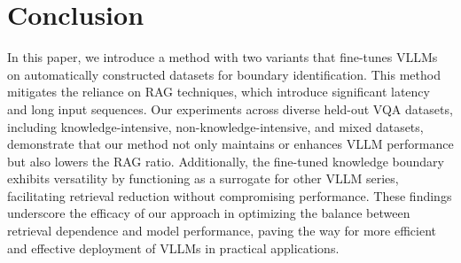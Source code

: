 \section{Conclusion}

In this paper, we introduce a method with two variants that fine-tunes VLLMs on automatically constructed datasets for boundary identification. This method mitigates the reliance on RAG techniques, which introduce significant latency and long input sequences. Our experiments across diverse held-out VQA datasets, including knowledge-intensive, non-knowledge-intensive, and mixed datasets, demonstrate that our method not only maintains or enhances VLLM performance but also lowers the RAG ratio. Additionally, the fine-tuned knowledge boundary exhibits versatility by functioning as a surrogate for other VLLM series, facilitating retrieval reduction without compromising performance. These findings underscore the efficacy of our approach in optimizing the balance between retrieval dependence and model performance, paving the way for more efficient and effective deployment of VLLMs in practical applications. 


